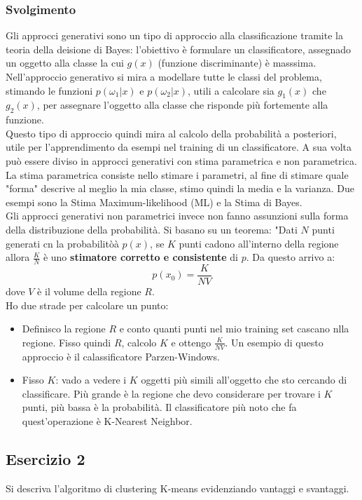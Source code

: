 \documentclass{article}
\begin{document}
\subsubsection*{Svolgimento}
Gli approcci generativi sono un tipo di approccio alla classificazione tramite la teoria della deisione di Bayes: l'obiettivo è formulare un classificatore, assegnado un oggetto alla classe la cui $g(x)$ (funzione discriminante) è masssima. Nell'approccio generativo si mira a modellare tutte le classi del problema, stimando le funzioni $p(\omega_1|x)$ e $p(\omega_2|x)$, utili a calcolare sia $g_1(x)$ che $g_2(x)$, per assegnare l'oggetto alla classe che risponde più fortemente alla funzione.\\
Questo tipo di approccio quindi mira al calcolo della probabilità a posteriori, utile per l'apprendimento da esempi nel training di un classificatore. A sua volta può essere diviso in approcci generativi con stima parametrica e non parametrica.
La stima parametrica consiste nello stimare i parametri, al fine di stimare quale "forma" descrive al meglio la mia classe, stimo quindi la media e la varianza. Due esempi sono la Stima Maximum-likelihood (ML) e la Stima di Bayes.\\
Gli approcci generativi non parametrici invece non fanno assunzioni sulla forma della distribuzione della probabilità. Si basano su un teorema: "Dati $N$ punti generati cn la probabilitòà $p(x)$, se $K$ punti cadono all'interno della regione allora $\frac{K}{N}$ è uno \textbf{stimatore corretto e consistente} di $p$. Da questo arrivo a:
$$ p(x_0) = \frac{K}{NV} $$
dove $V$ è il volume della regione $R$.\\
Ho due strade per calcolare un punto:
\begin{itemize}
    \item Definisco la regione $R$ e conto quanti punti nel mio training set cascano nlla regione. Fisso quindi $R$, calcolo $K$ e ottengo $\frac{K}{NV}$. Un esempio di questo approccio è il calassificatore Parzen-Windows.
    \item Fisso $K$: vado a vedere i $K$ oggetti più simili all'oggetto che sto cercando di classificare. Più grande è la regione che devo considerare per trovare i $K$ punti, più bassa è la probabilità. Il classificatore più noto che fa quest'operazione è K-Nearest Neighbor.
\end{itemize}

\subsection*{Esercizio 2}
Si descriva l'algoritmo di clustering K-means evidenziando vantaggi e svantaggi.
\end{document}
